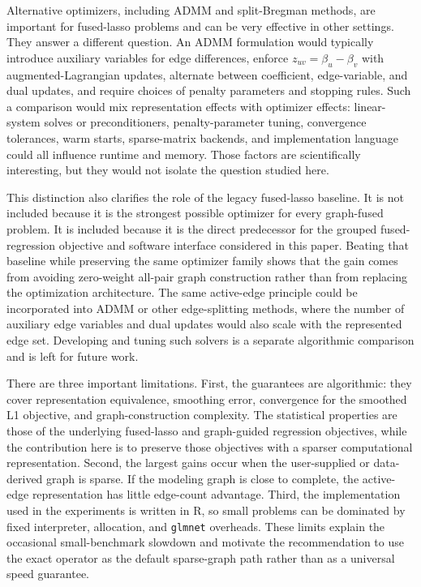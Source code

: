 \documentclass[twoside,11pt]{article}
\begin{document}
Alternative optimizers, including ADMM and split-Bregman methods, are
important for fused-lasso problems and can be very effective in other
settings. They answer a different question. An ADMM formulation would
typically introduce auxiliary variables for edge differences, enforce
$z_{uv}=\beta_u-\beta_v$ with augmented-Lagrangian updates, alternate between
coefficient, edge-variable, and dual updates, and require choices of penalty
parameters and stopping rules. Such a comparison would mix representation
effects with optimizer effects: linear-system solves or preconditioners,
penalty-parameter tuning, convergence tolerances, warm starts, sparse-matrix
backends, and implementation language could all influence runtime and memory.
Those factors are scientifically interesting, but they would not isolate the
question studied here.

This distinction also clarifies the role of the legacy fused-lasso baseline.
It is not included because it is the strongest possible optimizer for every
graph-fused problem. It is included because it is the direct predecessor for
the grouped fused-regression objective and software interface considered in
this paper. Beating that baseline while preserving the same optimizer family
shows that the gain comes from avoiding zero-weight all-pair graph
construction rather than from replacing the optimization architecture. The
same active-edge principle could be incorporated into ADMM or other
edge-splitting methods, where the number of auxiliary edge variables and dual
updates would also scale with the represented edge set. Developing and tuning
such solvers is a separate algorithmic comparison and is left for future work.

There are three important limitations. First, the guarantees are algorithmic:
they cover representation equivalence, smoothing error, convergence for the
smoothed L1 objective, and graph-construction complexity. The statistical
properties are those of the underlying fused-lasso and graph-guided regression
objectives, while the contribution here is to preserve those objectives with a
sparser computational representation. Second, the largest gains occur when the
user-supplied or data-derived graph is sparse. If the modeling graph is close
to complete, the active-edge representation has little edge-count advantage.
Third, the implementation used in the experiments is written in R, so small
problems can be dominated by fixed interpreter, allocation, and
\texttt{glmnet} overheads. These limits explain the occasional
small-benchmark slowdown and motivate the recommendation to use the exact
operator as the default sparse-graph path rather than as a universal speed
guarantee.
\end{document}
